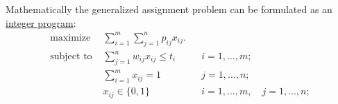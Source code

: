 Mathematically the generalized assignment problem can be formulated as
an \href{Integer_programming}{integer program}:
\begin{align} \text{maximize } &
\sum_{i=1}^m\sum_{j=1}^n
p_{ij} x_{ij}. \\
\text{subject to } & \sum_{j=1}^n
w_{ij} x_{ij} \le t_i & & i=1,
\ldots, m; \\ &
\sum_{i=1}^m x_{ij} = 1 & & j=1,
\ldots, n; \\ & x_{ij}
\in \{0,1\} & & i=1,
\ldots, m, \quad j=1,
\ldots, n; \end{align}

%
%
%
%
%
